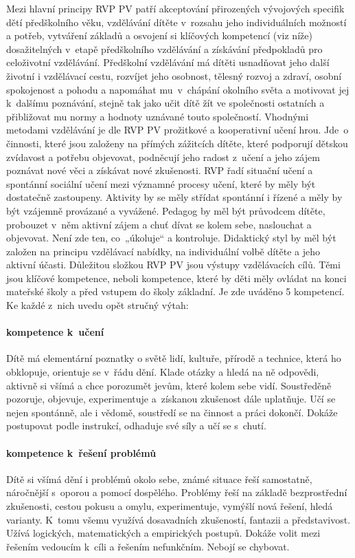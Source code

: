 				Mezi hlavní principy RVP PV patří akceptování přirozených vývojových specifik dětí předškolního věku, vzdělávání dítěte v rozsahu jeho individuálních možností a potřeb, vytváření základů a osvojení si klíčových kompetencí (viz níže) dosažitelných v etapě předškolního vzdělávání a získávání předpokladů pro celoživotní vzdělávání.
				Předškolní vzdělávání má dítěti usnadňovat jeho další životní i vzdělávací cestu, rozvíjet jeho osobnost, tělesný rozvoj a zdraví, osobní spokojenost a pohodu a napomáhat mu v chápání okolního světa a motivovat jej k dalšímu poznávání, stejně tak jako učit dítě žít ve společnosti ostatních a přibližovat mu normy a hodnoty uznávané touto společností.
				Vhodnými metodami vzdělávání je dle RVP PV prožitkové a kooperativní učení hrou. Jde o činnosti, které jsou založeny na přímých zážitcích dítěte, které podporují dětskou zvídavost a potřebu objevovat, podněcují jeho radost z učení a jeho zájem poznávat nové věci a získávat nové zkušenosti.
				RVP řadí situační učení a spontánní sociální učení mezi významné procesy učení, které by měly být dostatečně zastoupeny. Aktivity by se měly střídat spontánní i řízené a měly by být vzájemně provázané a vyvážené. Pedagog by měl být průvodcem dítěte, probouzet v něm aktivní zájem a chuť dívat se kolem sebe, naslouchat a objevovat. Není zde ten, co „úkoluje“ a kontroluje. Didaktický styl by měl být založen na principu vzdělávací nabídky, na individuální volbě dítěte a jeho aktivní účasti.
				Důležitou složkou RVP PV jsou výstupy vzdělávacích cílů. Těmi jsou klíčové kompetence, neboli kompetence, které by děti měly ovládat na konci mateřské školy a před vstupem do školy základní. Je zde uváděno 5 kompetencí. Ke každé z nich uvedu opět stručný výtah:

				\paragraph{kompetence k učení}
					Dítě má elementární poznatky o světě lidí, kultuře, přírodě a technice, která ho obklopuje, orientuje se v řádu dění. Klade otázky a hledá na ně odpovědi, aktivně si všímá a chce porozumět jevům, které kolem sebe vidí. Soustředěně pozoruje, objevuje, experimentuje a získanou zkušenost dále uplatňuje. Učí se nejen spontánně, ale i vědomě, soustředí se na činnost a práci dokončí. Dokáže postupovat podle instrukcí, odhaduje své síly a učí se s chutí.

				\paragraph{kompetence k řešení problémů}
					Dítě si všímá dění i problémů okolo sebe, známé situace řeší samostatně, náročnější s oporou a pomocí dospělého. Problémy řeší na základě bezprostřední zkušenosti, cestou pokusu a omylu, experimentuje, vymýšlí nová řešení, hledá varianty. K tomu všemu využívá dosavadních zkušeností, fantazii a představivost. Užívá logických, matematických a empirických postupů. Dokáže volit mezi řešením vedoucím k cíli a řešením nefunkčním. Nebojí se chybovat.

